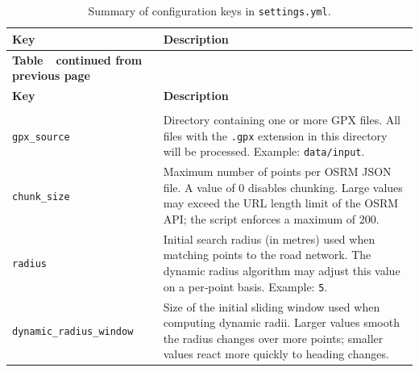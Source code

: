 \documentclass[11pt,a4paper]{article}
\begin{document}
\begin{longtable}{@{}>{\footnotesize\ttfamily}p{4cm}p{9cm}@{}}  \caption{Summary of configuration keys in \texttt{settings.yml}.\label{tab:settings}}                                                                                      \\
	\toprule
	\textbf{Key}                     & \textbf{Description}                                                                                                                                                                   \\
	\midrule
	\endfirsthead
	\multicolumn{2}{c}%
	{{\bfseries Table~\thetable\ continued from previous page}}                                                                                                                                                               \\
	\toprule
	\textbf{Key}                     & \textbf{Description}                                                                                                                                                                   \\
	\midrule
	\endhead
	\midrule \multicolumn{2}{r}{\emph{Continued on next page}}                                                                                                                                                                \\
	\endfoot
	\bottomrule
	\endlastfoot
	\texttt{gpx\_source}             & Directory containing one or more GPX files.  All files with the \texttt{.gpx} extension in this directory will be processed.  Example: \texttt{data/input}.                            \\
	\texttt{chunk\_size}             & Maximum number of points per OSRM JSON file.  A value of 0 disables chunking.  Large values may exceed the URL length limit of the OSRM API; the script enforces a maximum of 200.     \\
	\texttt{radius}                  & Initial search radius (in metres) used when matching points to the road network.  The dynamic radius algorithm may adjust this value on a per‑point basis.  Example: \texttt{5}.       \\
	\texttt{dynamic\_radius\_window} & Size of the initial sliding window used when computing dynamic radii.  Larger values smooth the radius changes over more points; smaller values react more quickly to heading changes. \\
\end{longtable}
\end{document}
